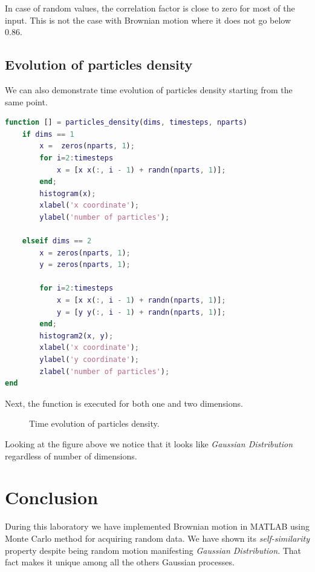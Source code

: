 \documentclass[12pt]{article}
\begin{document}
In case of random values, the correlation factor is close to zero for most of the input. This is not the case with Brownian motion where it does not go below 0.86.

\subsection{Evolution of particles density}

We can also demonstrate time evolution of particles density starting from the same point.

\begin{lstlisting}[language=Matlab, caption = {Source code for particles density}]
function [] = particles_density(dims, timesteps, nparts)
	if dims == 1
		x =  zeros(nparts, 1);
		for i=2:timesteps
			x = [x x(:, i - 1) + randn(nparts, 1)];
		end;
		histogram(x);
		xlabel('x coordinate');
		ylabel('number of particles');

	elseif dims == 2
		x = zeros(nparts, 1);
		y = zeros(nparts, 1);

		for i=2:timesteps
			x = [x x(:, i - 1) + randn(nparts, 1)];
			y = [y y(:, i - 1) + randn(nparts, 1)];
		end;
		histogram2(x, y);
		xlabel('x coordinate');
		ylabel('y coordinate');
		zlabel('number of particles');
end
\end{lstlisting}

Next, the function is executed for both one and two dimensions.

\begin{figure}[H]
	\centering
	\caption{Time evolution of particles density.}
\end{figure}

Looking at the figure above we notice that it looks like \textit{Gaussian Distribution} regardless of number of dimensions.


\section{Conclusion}

During this laboratory we have implemented Brownian motion in MATLAB using Monte Carlo method for acquiring random data. We have shown its \textit{self-similarity} property despite being random motion manifesting \textit{Gaussian Distribution}. That fact makes it unique among all the others Gaussian processes.
\end{document}
